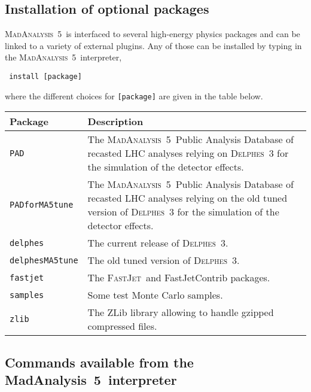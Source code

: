 \documentclass[a4paper]{article}
\newcommand{\MA}{\textsc{MadAnalysis}~5}
\newcommand{\MAnorm}{{MadAnalysis}~5}
\newcommand{\FJ}{\textsc{FastJet}}
\newcommand{\DEL}{\textsc{Delphes}}
\begin{document}
\begin{shaded}
\section{\Large Installation of optional packages}
\end{shaded}

\noindent \MA\ is interfaced to several high-energy physics packages and can be linked to
a variety of external plugins. Any of those can be installed by typing in the
\MA\ interpreter,
{\color{ao}\begin{verbatim} install [package]\end{verbatim}}
where the different choices for \verb+[package]+ are given in the table below.
\renewcommand{\arraystretch}{1.2}%
\begin{center}\begin{tabular}{l p{9.2cm}}
\hline
Package & Description\\
\hline
\color{ao} \verb?PAD?            & The \MA\ Public Analysis Database of recasted LHC
   analyses relying on \DEL~3 for the simulation of the detector effects.\\
\color{ao}\verb?PADforMA5tune?  & The \MA\ Public Analysis Database of recasted LHC
   analyses relying on the old tuned version of \DEL~3 for the simulation of the
   detector effects.\\
\color{ao}\verb?delphes?        & The current release of \DEL~3.\\
\color{ao}\verb?delphesMA5tune? & The old tuned version of \DEL~3.\\
\color{ao}\verb?fastjet?        & The \FJ\ and {\sc FastJetContrib} packages.\\
\color{ao}\verb?samples?        & Some test Monte Carlo samples.\\
\color{ao}\verb?zlib?           & The {\sc ZLib} library allowing to handle gzipped
                        compressed files.\\
\hline
\end{tabular}
\end{center}
\vspace{2cm}
\begin{shaded}
\section{\Large Commands available from the \MAnorm\ interpreter}
\end{shaded}
\end{document}
